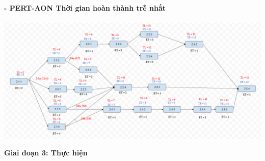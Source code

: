 \documentclass[12pt]{article}
\begin{document}
\hspace{1cm}\textbf{- PERT-AON Thời gian hoàn thành trễ nhất \\\\} 
\vspace*{0.5cm}    
\hspace{0.7cm}\includegraphics[width=14.5cm]{PERT2_2.png}
\vspace{0.5cm}  

\begin{center}
    \textbf{Giai đoạn 3: Thực hiện}
\end{center}
 
\end{document}
